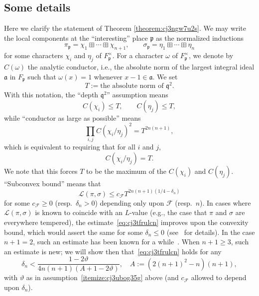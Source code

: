 \documentclass[reqno]{amsart}
\theoremstyle{plain} \newtheorem{theorem} {Theorem} \newtheorem{conjecture} {Conjecture} \newtheorem{corollary} [theorem] {Corollary} \newtheorem{proposition} [theorem] {Proposition} \newtheorem{fact} [theorem] {Fact}
\theoremstyle{definition} \newtheorem{definition} [theorem] {Definition}
\theoremstyle{itplain} %
\newcommand{\mfp}{\mathfrak{p}}
\begin{document}
\subsection{Some details}\label{sec:cj3v663hcw}
Here we clarify the statement of Theorem \ref{theorem:cj3ngw7u2s}.  We may write the local components at the ``interesting'' place $\mathfrak{p}$ as the normalized inductions
\begin{equation}\label{eqn:cj2dzujg9c}
  \pi_\mfp = \chi_1 \boxplus \dotsb \boxplus \chi_{n+1}, \qquad \sigma_\mfp = \eta_1 \boxplus \dotsb \boxplus \eta_n
\end{equation}
for some characters $\chi_i$ and $\eta_j$ of $F_\mfp^\times$.  For a character $\omega$ of $F_\mfp^\times$, we denote by $C(\omega)$ the analytic conductor, i.e., the absolute norm of the largest integral ideal $\mathfrak{a}$ in $F_\mfp$ such that $\omega(x) = 1$ whenever $x - 1 \in \mathfrak{a}$.  We set
\begin{equation}\label{eq:cj3ubsuj6v}
T := \text{the absolute norm of } \mathfrak{q}^2.
\end{equation}
With this notation, the ``depth $\mathfrak{q}^2$'' assumption means
\begin{equation}\label{eqn:20230516205128}
  C(\chi_i) \leq T, \qquad
  C(\eta_j) \leq T,
\end{equation}
while ``conductor as large as possible'' means
\begin{equation}\label{eqn:cj2dzunqa6}
  \prod_{i, j} {C(\chi_i/\eta_j)}^2 = T^{2 n(n+1)},
\end{equation}
which is equivalent to requiring that for all $i$ and $j$,
\begin{equation}\label{eqn:cj3ngvwrm4}
  C(\chi_i / \eta_j) = T.
\end{equation}
We note that this forces $T$ to be the maximum of the $C(\chi_i)$ and $C(\eta_j)$.  ``Subconvex bound'' means that
\begin{equation}\label{eq:cj3tfrulcn}
  \mathcal{L}(\pi,\sigma) \leq c_{\mathcal{F}} T^{2 n (n + 1)(1/4 - \delta_n)}
\end{equation}
for some $c _{\mathcal{F}} \geq 0$ (resp.\ $\delta_n > 0$) depending only upon $\mathcal{F}$ (resp.\ $n$).  In cases where $\mathcal{L}(\pi,\sigma)$ is known to coincide with an $L$-value (e.g., the case that $\pi$ and $\sigma$ are everywhere tempered), the estimate~\eqref{eq:cj3tfrulcn} improves upon the convexity bound, which would assert the same for some $\delta_n \leq 0$ (see~\cite[Proof of Cor 1.2]{2020arXiv201202187N} for details).  In the case $n+1 = 2$, such an estimate has been known for a while~\cite{michel-2009}.  When $n+1 \geq 3$, such an estimate is new; we will show then that~\eqref{eq:cj3tfrulcn} holds for any
\begin{equation}\label{eq:cj3ubs6lvw}
  \delta_n < \frac{1 - 2 \vartheta }{4 n(n+1) (A + 1 - 2 \vartheta )},
  \quad
  A := (2 {(n + 1 )}^2 - n) (n + 1),
\end{equation}
with $\vartheta$ as in assumption~\eqref{itemize:cj3ubog35g} above (and $c_\mathcal{F}$ allowed to depend upon $\delta_n$).
\end{document}
